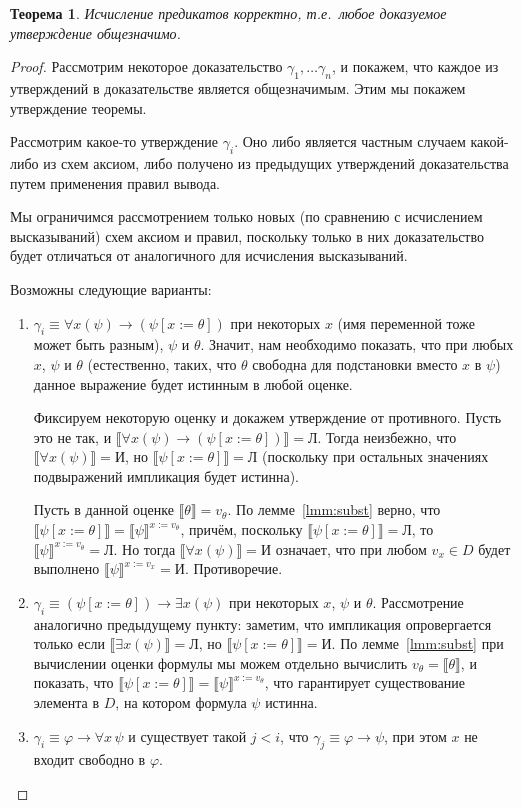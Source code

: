 \documentclass[a4paper,11pt]{article}
\newtheorem{thm}{Теорема}[section]
\theoremstyle{definition}
\newcommand{\sem}[2]{\llbracket #1 \rrbracket^{#2}}
\newcommand{\True}{\text{И}}
\newcommand{\False}{\text{Л}}
\begin{document}
\begin{thm}
Исчисление предикатов корректно, т.е.\ любое доказуемое утверждение
общезначимо.
\end{thm}
\begin{proof}
Рассмотрим некоторое доказательство $\gamma_1, \dots \gamma_n$, и покажем, что
каждое из утверждений в доказательстве является общезначимым. Этим мы покажем
утверждение теоремы.

Рассмотрим какое-то утверждение $\gamma_i$. Оно либо является частным случаем
какой-либо из схем аксиом, либо получено из предыдущих утверждений
доказательства путем применения правил вывода.

Мы ограничимся рассмотрением только новых (по сравнению с исчислением
высказываний) схем аксиом и правил, поскольку только в них доказательство будет
отличаться от аналогичного для исчисления высказываний.

Возможны следующие варианты:
\begin{enumerate}
\item $\gamma_i \equiv \forall x(\psi) \to (\psi[x := \theta])$ при некоторых $x$
  (имя переменной тоже может быть разным), $\psi$ и $\theta$. Значит, нам
  необходимо показать, что при любых $x$, $\psi$ и $\theta$ (естественно, таких,
  что $\theta$ свободна для подстановки вместо $x$ в $\psi$) данное выражение
  будет истинным в любой оценке.

  Фиксируем некоторую оценку и докажем утверждение от противного. Пусть это не
  так, и $\llbracket\forall x(\psi) \to (\psi[x := \theta])\rrbracket = \False$.
  Тогда неизбежно, что $\llbracket\forall x(\psi)\rrbracket = \True$, но
  $\llbracket\psi[x := \theta]\rrbracket = \False$ (поскольку при остальных
  значениях подвыражений импликация будет истинна).

  Пусть в данной оценке $\llbracket\theta\rrbracket = v_\theta$. По
  лемме~\ref{lmm:subst} верно, что $\llbracket\psi[x := \theta]\rrbracket =
  \sem{\psi}{x:=v_\theta}$, причём, поскольку $\llbracket\psi[x :=
  \theta]\rrbracket = \False$, то $\sem{\psi}{x:=v_\theta} = \False$. Но тогда
  $\llbracket\forall x(\psi)\rrbracket = \True$ означает, что при любом $v_x \in
  D$ будет выполнено $\sem{\psi}{x:=v_x} = \True$. Противоречие.
\item $\gamma_i \equiv (\psi[x := \theta]) \to \exists x(\psi)$ при некоторых
  $x$, $\psi$ и $\theta$. Рассмотрение аналогично предыдущему пункту: заметим,
  что импликация опровергается только если $\llbracket\exists x(\psi)\rrbracket =
  \False$, но $\llbracket\psi[x := \theta]\rrbracket = \True$. По
  лемме~\ref{lmm:subst} при вычислении оценки формулы мы можем отдельно
  вычислить $v_\theta = \llbracket\theta\rrbracket$, и показать, что
  $\llbracket\psi[x := \theta]\rrbracket = \sem{\psi}{x:=v_\theta}$, что
  гарантирует существование элемента в $D$, на котором формула $\psi$ истинна.
\item $\gamma_i \equiv \varphi \to \forall x\,\psi$ и существует такой $j < i$,
  что $\gamma_j \equiv \varphi \to \psi$, при этом $x$ не входит свободно в
  $\varphi$.


\end{enumerate}
\end{proof}
\end{document}

